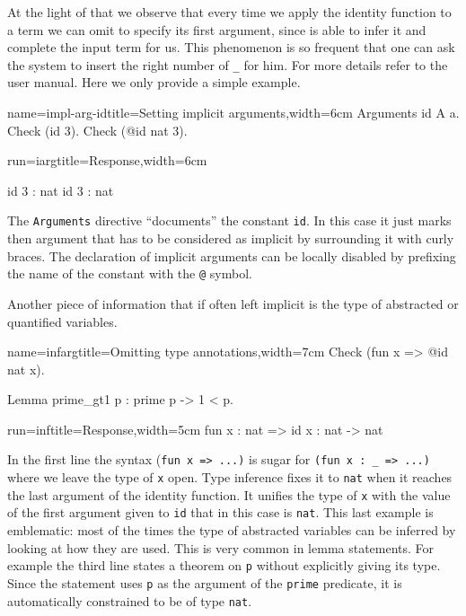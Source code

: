 At the light of that we observe that every time we apply the identity
function to a term we can omit to specify its first argument,
since \Coq{} is able to infer it and complete the input term for us.
This phenomenon is so frequent that one can ask the system to insert
the right number of \lstinline/_/ for him.  For more details
refer to the user manual.  Here
we only provide a simple example.

\begin{coq}{name=impl-arg-id}{title=Setting implicit arguments,width=6cm}
Arguments id {A} a.
Check (id 3).
Check (@id nat 3).
\end{coq}
\begin{coqout}{run=iarg}{title=Response,width=6cm}

id 3 : nat
id 3 : nat
\end{coqout}

The \lstinline/Arguments/ directive ``documents'' the constant
\lstinline/id/.  In this case it just marks then argument that has to
be considered as implicit by surrounding it with curly braces.
The declaration of implicit arguments can be locally disabled by
prefixing the name of the constant with the \lstinline/@/ symbol.

Another piece of information that if often left implicit is
the type of abstracted or quantified variables.

\begin{coq}{name=infarg}{title=Omitting type annotations,width=7cm}
Check (fun x => @id nat x).

Lemma prime_gt1 p : prime p -> 1 < p.
\end{coq}
\begin{coqout}{run=inf}{title=Response,width=5cm}
fun x : nat => id x :
  nat -> nat
$~$
\end{coqout}

In the first line the syntax (\lstinline/fun x => ...)/ is sugar for
\lstinline/(fun x : _ => ...)/ where we leave the type of
\lstinline/x/ open.  Type inference fixes it to \lstinline/nat/
when it reaches the last argument of the identity function.
It unifies the type of \lstinline/x/ with the value of the first
argument given to \lstinline/id/ that in this case is \lstinline/nat/.
This last example is emblematic: most of the times the type of
abstracted variables can be inferred by looking at how they are used.
This is very common in lemma statements.  For example the third line
states a theorem on \lstinline/p/ without explicitly giving its type.
Since the statement uses \lstinline/p/ as the argument of the
\lstinline/prime/ predicate, it is automatically constrained to be
of type \lstinline/nat/.

